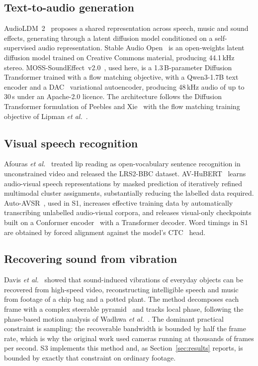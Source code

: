 \documentclass[conference]{IEEEtran}
\begin{document}
\subsection{Text-to-audio generation}

AudioLDM~2~\cite{audioldm2} proposes a shared representation across speech, music
and sound effects, generating through a latent diffusion model conditioned on a
self-supervised audio representation. Stable Audio Open~\cite{stableaudio2024} is
an open-weights latent diffusion model trained on Creative Commons material,
producing 44.1\,kHz stereo. MOSS-SoundEffect~v2.0~\cite{moss2026}, used here, is a
1.3\,B-parameter Diffusion Transformer trained with a flow matching objective,
with a Qwen3-1.7B text encoder and a DAC~\cite{dac2023} variational autoencoder,
producing 48\,kHz audio of up to 30\,s under an Apache-2.0 licence. The
architecture follows the Diffusion Transformer formulation of Peebles and
Xie~\cite{dit2023} with the flow matching training objective of Lipman \emph{et
al.}~\cite{flowmatching2023}.

\subsection{Visual speech recognition}

Afouras \emph{et al.}~\cite{afouras2018} treated lip reading as open-vocabulary
sentence recognition in unconstrained video and released the LRS2-BBC dataset.
AV-HuBERT~\cite{avhubert2022} learns audio-visual speech representations by masked
prediction of iteratively refined multimodal cluster assignments, substantially
reducing the labelled data required. Auto-AVSR~\cite{autoavsr2023}, used in S1,
increases effective training data by automatically transcribing unlabelled
audio-visual corpora, and releases visual-only checkpoints built on a Conformer
encoder~\cite{conformer2020} with a Transformer decoder. Word timings in S1 are
obtained by forced alignment against the model's CTC~\cite{ctc2006} head.

\subsection{Recovering sound from vibration}

Davis \emph{et al.}~\cite{visualmic2014} showed that sound-induced vibrations of
everyday objects can be recovered from high-speed video, reconstructing
intelligible speech and music from footage of a chip bag and a potted plant. The
method decomposes each frame with a complex steerable
pyramid~\cite{steerable1995} and tracks local phase, following the phase-based
motion analysis of Wadhwa \emph{et al.}~\cite{phasebased2013}. The dominant
practical constraint is sampling: the recoverable bandwidth is bounded by half
the frame rate, which is why the original work used cameras running at thousands
of frames per second. S3 implements this method and, as Section~\ref{sec:results}
reports, is bounded by exactly that constraint on ordinary footage.
\end{document}
